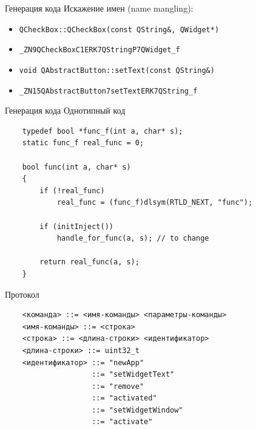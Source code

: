 \documentclass[aspectratio=1610]{beamer}
\begin{document}

\begin{frame}{Генерация кода}
	Искажение имен (name mangling):
	\begin{itemize}		
		\item \texttt{QCheckBox::QCheckBox(const QString\&, QWidget*)}
		\item \texttt{\_ZN9QCheckBoxC1ERK7QStringP7QWidget\_f}
		\item \texttt{void QAbstractButton::setText(const QString\&)}
		\item \texttt{\_ZN15QAbstractButton7setTextERK7QString\_f}
	\end{itemize}
\end{frame}

\begin{frame}[fragile]{Генерация кода}
	Однотипный код
	\begin{verbatim}
    typedef bool *func_f(int a, char* s);
    static func_f real_func = 0;

    bool func(int a, char* s)
    {
        if (!real_func)
            real_func = (func_f)dlsym(RTLD_NEXT, "func");

        if (initInject())
            handle_for_func(a, s); // to change
            
        return real_func(a, s);
    }
	\end{verbatim}
\end{frame}

\begin{frame}[fragile]{Протокол}
	\begin{verbatim}
    <команда> ::= <имя-­команды> <параметры-­команды>
    <имя-­команды> ::= <строка>
    <строка> ::= <длина-­строки> <идентификатор>
    <длина-­строки> ::= uint32_t
    <идентификатор> ::= "newApp"
                    ::= "setWidgetText"
                    ::= "remove"
                    ::= "activated"
                    ::= "setWidgetWindow"
                    ::= "activate"
	\end{verbatim}
\end{frame}

\end{document}
